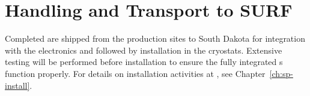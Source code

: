 \section{Handling and Transport to SURF} %
\label{sec:fdsp-apa-transport}

Completed  are shipped from the  production sites to South Dakota for integration with the   electronics and  followed by installation in the  cryostats.  %
Extensive  testing will be performed before installation to ensure the fully integrated s function properly.  %
For details on installation activities at \surf, see Chapter~\ref{ch:sp-install}. %




